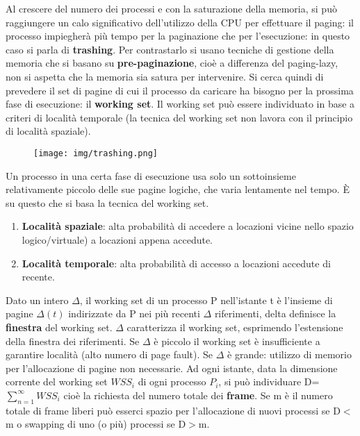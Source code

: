 \documentclass{article}
\begin{document}
\noindent Al crescere del numero dei processi e con la saturazione della memoria, si può raggiungere un calo significativo dell'utilizzo
della CPU per effettuare il paging: il processo impiegherà più tempo per la paginazione che per l'esecuzione: in questo caso si parla di 
\textbf{trashing}. Per contrastarlo si usano tecniche di gestione della memoria che si basano su \textbf{pre-paginazione}, cioè a differenza del 
paging-lazy, non si aspetta che la memoria sia satura per intervenire. Si cerca quindi di prevedere il set di pagine di cui il processo
 da caricare ha bisogno per la prossima fase di esecuzione: il \textbf{working set}. Il working set può essere individuato in base a criteri di 
 località temporale (la tecnica del working set non lavora con il principio di località spaziale).


\begin{figure}[h!]
    \begin{center}
        \texttt{[image: img/trashing.png]}     
    \end{center}
\end{figure}

\noindent Un processo in una certa fase di esecuzione usa solo un sottoinsieme relativamente piccolo delle sue pagine logiche, che varia lentamente nel tempo.
È su questo che si basa la tecnica del working set.

\begin{enumerate}
    \item \textbf{Località spaziale}: alta probabilità di accedere a locazioni vicine nello spazio logico/virtuale) a locazioni appena accedute.
    \item \textbf{Località temporale}: alta probabilità di accesso a locazioni accedute di recente.
\end{enumerate}

\noindent Dato un intero $\Delta$, il working set di un processo P nell'istante t è l'insieme di pagine $\Delta(t)$ indirizzate da P nei più recenti $\Delta$ riferimenti,
delta definisce la \textbf{finestra} del working set. $\Delta$ caratterizza il working set, esprimendo l'estensione della finestra dei riferimenti. Se $\Delta$ è piccolo il
 working set è insufficiente a garantire località (alto numero di page fault). Se $\Delta$ è grande: utilizzo di memorio per l'allocazione di pagine non necessarie.
Ad ogni istante, data la dimensione corrente del working set \textbf{$WSS_i$} di ogni processo $P_i$, si può individuare D=$\sum_{n = 1}^{\infty}WSS_i$ cioè la richiesta del numero 
totale dei \textbf{frame}. Se m è il numero totale di frame liberi può esserci spazio per l'allocazione di nuovi processi se D$<$m o swapping di uno (o più) processi se D$>$m.
\medskip
\end{document}
